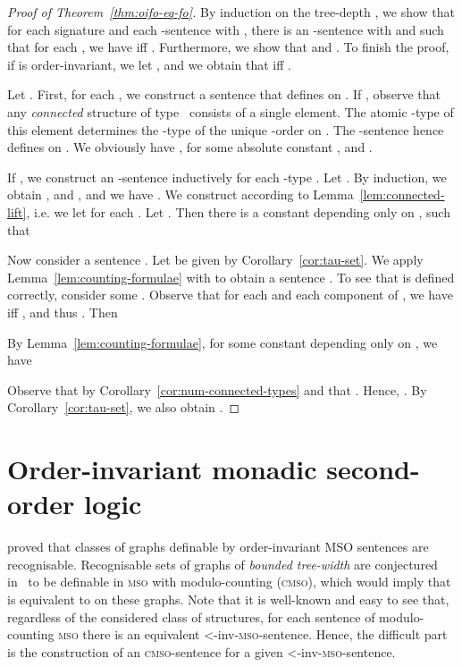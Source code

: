 \documentclass[11pt]{article}
\newcommand{\logic}[1]{\textsc{#1}}
\newcommand{\MSO}{\logic{mso}}
\newcommand{\CMSO}{\logic{cmso}}
\newcommand{\ordinv}[1]{\textnormal{{\small \textless}-inv-}#1}
\newcommand{\oiMSO}{\ordinv{\MSO{}}}
\begin{document}
\begin{proof}[Proof of Theorem~\ref{thm:oifo-eq-fo}]
  By induction on the tree-depth , 
  we show that for each signature  and each -sentence  with , there is an -sentence  with  and  such that for each ,
  we have  iff .
  Furthermore, we show that  and .
  To finish the proof, if  is order-invariant, we let , and we obtain that  iff . 

  Let .
  First, for each , we construct a sentence  that
  defines  on . If , observe
  that any \emph{connected} structure  of
  type~ consists of a single element. The atomic -type 
  of this element determines the -type of the unique -order on .
  The -sentence 
  hence defines  on . We obviously have
  , for some absolute
  constant , and  .

  If , we construct an -sentence  inductively for each -type .
  Let . 
  By induction, we obtain , and , and we have .
  We construct  according to Lemma~\ref{lem:connected-lift},
  i.e. we let  for each . Let .
  Then there is a constant  depending only on ,
  such that 
  

  Now consider a sentence .  Let
   be given by Corollary~\ref{cor:tau-set}. We apply
  Lemma~\ref{lem:counting-formulae} with  to obtain a
  sentence .  To see that
   is defined correctly, consider some .  Observe that for each  and each
  component  of , we have  iff
  , and thus .  Then
  
  
  By Lemma~\ref{lem:counting-formulae}, for some constant  depending only on , we
  have
  
  Observe that  by Corollary~\ref{cor:num-connected-types} and that
  . Hence,
  .
  By Corollary~\ref{cor:tau-set}, we also obtain
  .
\end{proof}

\section{Order-invariant monadic second-order logic}
\label{sec:oimso}

\cite[Thm.~4.1]{Courcelle1996} proved that classes of graphs
definable by order-invariant MSO sentences are recognisable. Recognisable sets
of graphs of \emph{bounded tree-width} are conjectured in~\cite[Conjecture
1]{Courcelle1991} to be definable in \MSO{} with modulo-counting (\CMSO{}),
which would imply that  is equivalent to  on these graphs. Note
that it is well-known and easy to see that, regardless of the considered class
of structures, for each sentence of modulo-counting \MSO{} there is an
equivalent \oiMSO{}-sentence. Hence, the difficult part is the construction of
an \CMSO{}-sentence for a given \oiMSO{}-sentence.
\end{document}

